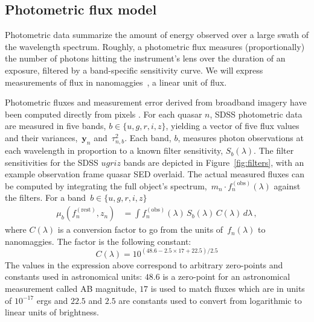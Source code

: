 \documentclass{article}
\begin{document}
\subsection{Photometric flux model }
Photometric data summarize the amount of energy observed over a large swath of the wavelength spectrum. 
Roughly, a photometric flux measures (proportionally) the number of photons hitting the instrument's lens over the duration of an exposure, filtered by a band-specific sensitivity curve. 
We will express measurements of flux in nanomaggies~\cite{sdssnanomaggies}, a linear unit of flux. 

Photometric fluxes and measurement error derived from broadband imagery have been computed directly from pixels \cite{luptonsdss}.  
For each quasar $n$, SDSS photometric data are measured in five bands, ${b \in \{u,g,r,i,z\}}$, yielding a vector of five flux values and their variances,~$\mathbf{y}_n$ and~$\tau^2_{n, b}$.  
Each band, $b$, measures photon observations at each wavelength in proportion to a known filter sensitivity, $S_{b}(\lambda)$. 
The filter sensitivities for the SDSS $ugriz$ bands are depicted in Figure~\ref{fig:filters}, with an example observation frame quasar SED overlaid.  
The actual measured fluxes can be computed by integrating the full object's spectrum,~${m_n \cdot f_n^{(\text{obs})}(\lambda)}$ against the filters.
For a band~${b \in \{u, g, r, i, z \}}$
\begin{align}
  \mu_b(f_n^{(\text{rest})}, z_n) &= \int f^{(\text{obs})}_n(\lambda) \,S_b(\lambda)\, C(\lambda) \,d \lambda \,,
\end{align}
where $C(\lambda)$ is a conversion factor to go from the units of~$f_n(\lambda)$ to nanomaggies.
The factor is the following constant:
\begin{equation*}
C(\lambda) = 10^{(48.6-2.5\times 17+22.5)/2.5}
\end{equation*}
The values in the expression above correspond to arbitrary zero-points and constants used in astronomical units: $48.6$ is a zero-point for an astronomical measurement called AB magnitude, $17$ is used to match fluxes which are in units of $10^{-17}$ ergs and $22.5$ and $2.5$ are constants used to convert from logarithmic to linear units of brightness.
\end{document}

